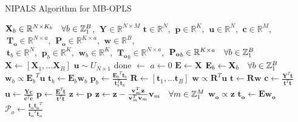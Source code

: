 \begin{algorithm}[H]
\caption{NIPALS Algorithm for MB-OPLS}
\label{algorithm.3.6}
\begin{algorithmic}[1]
\REQUIRE $\mathbf{X}_b \in \mathbb{R}^{N \times K_b}
          \quad \forall b \in \mathbb{Z}_{1}^{B}$,%
       $\:\mathbf{Y} \in \mathbb{R}^{N \times M}$
\ENSURE $\mathbf{t} \in \mathbb{R}^N$,%
      $\:\mathbf{p} \in \mathbb{R}^K$,%
      $\:\mathbf{u} \in \mathbb{R}^N$,%
      $\:\mathbf{c} \in \mathbb{R}^M$,%
      $\:\mathbf{T_o} \in \mathbb{R}^{N \times a}$,%
      $\:\mathbf{P_o} \in \mathbb{R}^{K \times a}$,%
      $\:\mathbf{w} \in \mathbb{R}^B$, \\
      $\:\mathbf{t}_b \in \mathbb{R}^N$,%
      $\:\mathbf{p}_b \in \mathbb{R}^K$,%
      $\:\mathbf{w}_b \in \mathbb{R}^K$,%
      $\:\mathbf{T_o}_b \in \mathbb{R}^{N \times a}$,%
      $\:\mathbf{P_o}_b \in \mathbb{R}^{K \times a}
       \quad \forall b \in \mathbb{Z}_{1}^{B}$
\STATE $\mathbf{X} \gets [\mathbf{X}_1, \dots \mathbf{X}_B]$
\STATE $\mathbf{u} \sim U_{N \times 1}$ 
\STATE done $\gets$ \FALSE
\STATE $a \gets 0$
\STATE $\mathbf{E} \gets \mathbf{X}$
\STATE $\mathbf{E}_b \gets \mathbf{X}_b
        \quad \forall b \in \mathbb{Z}_{1}^{B}$
  \REPEAT
      \STATE $\mathbf{w}_b \propto {\mathbf{E}_b}^T \mathbf{u}$
      \STATE $\mathbf{t}_b \gets \mathbf{E}_b \mathbf{w}_b$
      \STATE $\mathbf{p}_b \gets \tfrac{{\mathbf{E}_b}^T \mathbf{t}_b}
                                       {\mathbf{t}_b^T \mathbf{t}_b}$
    \ENDFOR
    \STATE $\mathbf{R} \gets [\mathbf{t}_1, \dots \mathbf{t}_B]$
    \STATE $\mathbf{w} \propto \mathbf{R}^T \mathbf{u}$
    \STATE $\mathbf{t} \gets \mathbf{R} \mathbf{w}$
    \STATE $\mathbf{c} \gets \tfrac{\mathbf{Y}^T \mathbf{t}}
                                   {\mathbf{t}^T \mathbf{t}}$
    \STATE $\mathbf{u} \gets \tfrac{\mathbf{Y} \mathbf{c}}
                                   {\mathbf{c}^T \mathbf{c}}$
  \UNTIL{$\tau < \varepsilon$}
  \STATE $\mathbf{p} \gets \tfrac{\mathbf{E}^T \mathbf{t}}
                                 {\mathbf{t}^T \mathbf{t}}$
  \STATE $\mathbf{z} \gets \mathbf{p}$
  \STATE $\mathbf{z} \gets \mathbf{z} -
          \tfrac{\mathbf{v}_m^T \mathbf{z}}
                {\mathbf{v}_m^T \mathbf{v}_m} \mathbf{v}_m
          \quad \forall m \in \mathbb{Z}_{1}^{M}$
  \STATE $\mathbf{w_o} \propto \mathbf{z}$
  \STATE $\mathbf{t_o} \gets \mathbf{E} \mathbf{w_o}$
  \STATE $\mathcal{P}_o \gets \tfrac{\mathbf{t_o} \mathbf{t_o}^T}
                                    {\mathbf{t_o}^T \mathbf{t_o}}$

\end{algorithmic}
\end{algorithm}
